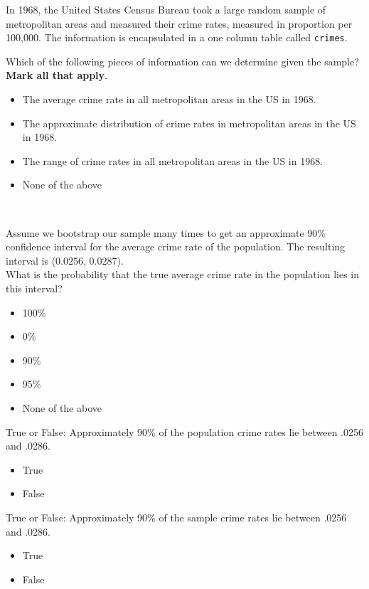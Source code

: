 
In 1968, the United States Census Bureau took a large random sample of metropolitan areas and measured their crime rates, measured in proportion per 100,000. The information is encapsulated in a one column table called {\tt crimes}.

\begin{enumerate}

 Which of the following pieces of information can we determine given the sample? \textbf{Mark all that apply}.
\begin{itemize}[label=\bubble]
\item The average crime rate in all metropolitan areas in the US in 1968.
\item The approximate distribution of crime rates in metropolitan areas in the US in 1968.
\item The range of crime rates in all metropolitan areas in the US in 1968.
\item None of the above
\end{itemize}  \\

Assume we bootstrap our sample many times to get an approximate 90\% confidence interval for the average crime rate of the population. The resulting interval is (0.0256, 0.0287).\\

 What is the probability that the true average crime rate in the population lies in this interval?
\begin{itemize}[label=\bubble]
\item 100\%
\item 0\%
\item 90\%
\item 95\%
\item None of the above\\
\end{itemize}  

 True or False: Approximately 90\% of the population crime rates lie between .0256 and .0286. 
\begin{itemize}[label=\bubble]
\item True
\item False\\
\end{itemize}  

 True or False:  Approximately 90\% of the sample crime rates lie between .0256 and .0286. 
\begin{itemize}[label=\bubble]
\item True
\item False\\
\end{itemize}  


\end{enumerate}
